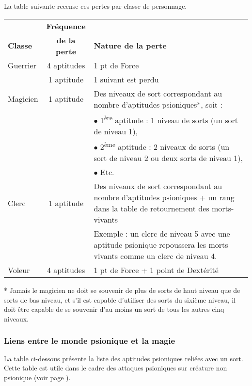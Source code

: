 \bigskip

La table suivante recense ces pertes par classe de personnage.

\bigskip

\begin{tabular}{lcp{12cm}}
& \textbf{Fréquence} & \\
\textbf{Classe} & \textbf{de la perte} & \textbf{Nature de la perte}\\
Guerrier & 4 aptitudes & 1 pt de Force \\
& 1 aptitude & 1 suivant est perdu \\
Magicien & 1 aptitude & Des niveaux de sort correspondant au nombre d'aptitudes psioniques*, soit : \\
&& $\bullet$ 1\textsuperscript{ère} aptitude : 1 niveau de sorts (un sort de niveau 1), \\
&& $\bullet$ 2\textsuperscript{ème} aptitude : 2 niveaux de sorts (un sort de niveau 2 ou deux sorts de niveau 1), \\
&& $\bullet$ Etc. \\
Clerc & 1 aptitude & Des niveaux de sort correspondant au nombre d'aptitudes psioniques + un rang dans la table de retournement des morts-vivants \\
&& Exemple : un clerc de niveau 5 avec une aptitude psionique repoussera les morts vivants comme un clerc de niveau 4. \\
Voleur & 4 aptitudes & 1 pt de Force + 1 point de Dextérité \\
\end{tabular}

\bigskip

* Jamais le magicien ne doit se souvenir de plus de sorts de haut niveau que de sorts de bas niveau, et s'il est capable d'utiliser des sorts du sixième niveau, il doit être capable de se souvenir d'au moins un sort de tous les autres cinq niveaux.

\subsubsection*{Liens entre le monde psionique et la magie}
\label{custom-liens-aptitudes-sorts}

La table ci-dessous présente la liste des aptitudes psioniques reliées avec un sort. Cette table est utile dans le cadre des attaques psioniques sur créature non psionique (voir page \pageref{custom-attaque-non-psionique}).

